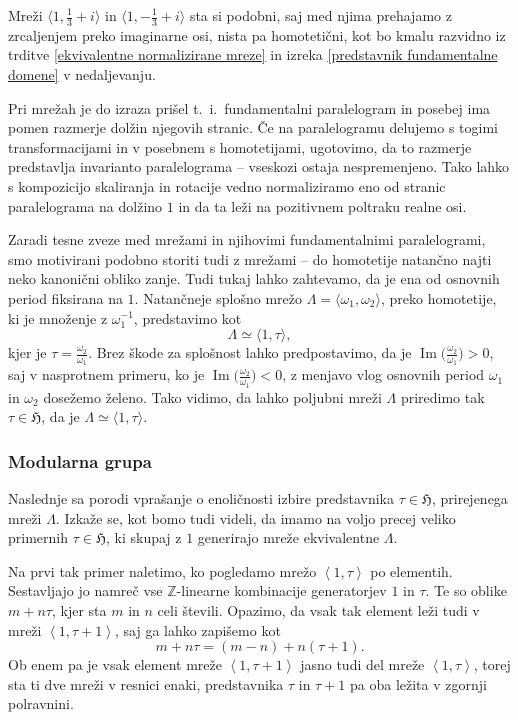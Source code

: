 \documentclass[mat1]{fmfdelo}
\numberwithin{equation}{section}
\newcommand{\Z}{\mathbb Z}
\newcommand{\HH}{\mathfrak{H}}
\newcommand{\om}{\omega}
\newcommand{\inv}{^{-1}}
\newcommand{\htp}{\simeq}
\newcommand{\lattice}[2]{\left\langle #1, #2 \right\rangle}
\renewcommand\Im{\operatorname{Im}}%
\newcommand{\ti}{t.~i.\ }
\theoremstyle{definition}
\begin{document}
\begin{primer*}
    Mreži $\langle 1, \frac{1}{3} + i \rangle$ in $\langle 1, -\frac{1}{3} + i \rangle$ sta si podobni, saj med njima prehajamo z zrcaljenjem preko imaginarne osi, nista pa homotetični, kot bo kmalu razvidno iz trditve \ref{ekvivalentne normalizirane mreze} in izreka \ref{predstavnik fundamentalne domene} v nedaljevanju. 
\end{primer*}
Pri mrežah je do izraza prišel \ti fundamentalni paralelogram in posebej ima pomen razmerje dolžin njegovih stranic. Če na paralelogramu delujemo s togimi transformacijami in v posebnem s homotetijami, ugotovimo, da to razmerje predstavlja invarianto paralelograma -- vseskozi ostaja nespremenjeno. Tako lahko s kompozicijo skaliranja in rotacije vedno normaliziramo eno od stranic paralelograma na dolžino $1$ in da ta leži na pozitivnem poltraku realne osi.  

Zaradi tesne zveze med mrežami in njihovimi fundamentalnimi paralelogrami, smo motivirani podobno storiti tudi z mrežami -- do homotetije natančno najti neko kanonični obliko zanje. 
Tudi tukaj lahko zahtevamo, da je ena od osnovnih period fiksirana na $1$. Natančneje splošno mrežo $\Lambda = \langle \om_1, \om_2 \rangle$, preko homotetije, ki je množenje z $\om_1\inv$, predstavimo kot
\[
    \Lambda \htp \langle 1, \tau \rangle,
\]
kjer je $\tau = \frac{\om_2}{\om_1}$. Brez škode za splošnost lahko predpostavimo, da je $\Im\big(\frac{\om_2}{\om_1}\big) > 0$, saj v nasprotnem primeru, ko je $\Im\big(\frac{\om_2}{\om_1}\big) < 0$, z menjavo vlog osnovnih period $\om_1$ in $\om_2$ dosežemo želeno. Tako vidimo, da lahko poljubni mreži $\Lambda$ priredimo tak $\tau \in \HH$, da je $\Lambda \htp \langle 1, \tau \rangle$.

\subsubsection{Modularna grupa}
Naslednje sa porodi vprašanje o enoličnosti izbire predstavnika $\tau \in \HH$, prirejenega mreži $\Lambda$. Izkaže se, kot bomo tudi videli, da imamo na voljo precej veliko primernih $\tau \in \HH$, ki skupaj z $1$ generirajo mreže ekvivalentne $\Lambda$. 

Na prvi tak primer naletimo, ko pogledamo mrežo $\lattice{1}{\tau}$ po elementih.
Sestavljajo jo namreč vse $\Z$-linearne kombinacije generatorjev $1$ in $\tau$. Te so oblike $m + n\tau$, kjer sta $m$ in $n$ celi števili. Opazimo, da vsak tak element leži tudi v mreži $\lattice{1}{\tau + 1}$, saj ga lahko zapišemo kot
\[
    m + n\tau = (m - n) + n(\tau + 1).
\] 
Ob enem pa je vsak element mreže $\lattice{1}{\tau + 1}$ jasno tudi del mreže $\lattice{1}{\tau}$, torej sta ti dve mreži v resnici enaki, predstavnika $\tau$ in $\tau + 1$ pa oba ležita v zgornji polravnini.
\end{document}
